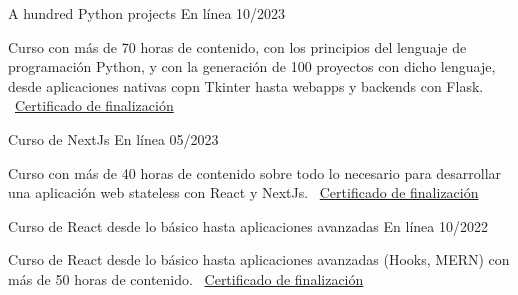 \documentclass[]{awesome-cv}
\begin{document}
\vspace{4mm}
\begin{cventries}
	\vspace{2mm}
    \cventry
	{}
	{A hundred Python projects \vspace{-4mm}}
	{En línea \vspace{-5mm}}
	{10/2023 \vspace{-5mm}}
	{\begin{cvsectionnormaltext} 
		\item{Curso con más de 70 horas de contenido, con los principios del lenguaje de programación Python, y con la generación de 100 proyectos con dicho lenguaje, desde aplicaciones nativas copn Tkinter hasta webapps y backends con Flask.
		\newline \vspace{2mm} \faLink\ \href{https://www.udemy.com/certificate/UC-2d01021e-af92-434c-a4a3-7fc7b33976c9/}{Certificado de finalización}}
	\end{cvsectionnormaltext}}
    {}
    
	\cventry
	{}
	{Curso de NextJs \vspace{-4mm}}
	{En línea \vspace{-5mm}}
	{05/2023 \vspace{-5mm}}
	{\begin{cvsectionnormaltext} 
		\item{Curso con más de 40 horas de contenido sobre todo lo necesario para desarrollar una aplicación web stateless con React y NextJs.
		\newline \vspace{2mm} \faLink\ \href{https://www.udemy.com/certificate/UC-1ede8757-aa0d-406f-813a-8eaa400532c5/}{Certificado de finalización}}
	\end{cvsectionnormaltext}}
    {}

	\cventry
	{}
	{Curso de React desde lo básico hasta aplicaciones avanzadas \vspace{-4mm}}
	{En línea \vspace{-5mm}}
	{10/2022 \vspace{-5mm}}
	{\begin{cvsectionnormaltext} 
		\item{Curso de React desde lo básico hasta aplicaciones avanzadas (Hooks, MERN) con más de 50 horas de contenido.
		\newline \vspace{2mm} \faLink\ \href{https://www.udemy.com/certificate/UC-fcb467ab-c089-419c-9b6a-afe97f894d14/}{Certificado de finalización}}
	\end{cvsectionnormaltext}}
    {}


\end{cventries}
\end{document}
